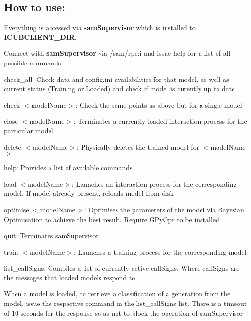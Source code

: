 \subsection*{How to use\+:}

Everything is accessed via {\bfseries sam\+Supervisor} which is installed to {\bfseries I\+C\+U\+B\+C\+L\+I\+E\+N\+T\+\_\+\+D\+IR}.

Connect with {\bfseries sam\+Supervisor} via {\ttfamily /sam/rpc\+:i} and issue {\ttfamily help} for a list of all possible commands
\begin{DoxyItemize}
\item {\ttfamily check\+\_\+all}\+: Check data and config.\+ini availabilities for that model, as well as current status (Training or Loaded) and check if model is curently up to date
\item {\ttfamily check $<$model\+Name$>$}\+: Check the same points as above but for a single model
\item {\ttfamily close $<$model\+Name$>$}\+: Terminates a currently loaded interaction process for the particular model
\item {\ttfamily delete $<$model\+Name$>$}\+: Physically deletes the trained model for {\ttfamily $<$model\+Name$>$}
\item {\ttfamily help}\+: Provides a list of available commands
\item {\ttfamily load $<$model\+Name$>$}\+: Launches an interaction process for the corresponding model. If model already present, reloads model from disk
\item {\ttfamily optimise $<$model\+Name$>$}\+: Optimises the parameters of the model via Bayesian Optimisation to achieve the best result. Require G\+Py\+Opt to be installed
\item {\ttfamily quit}\+: Terminates sam\+Supervisor
\item {\ttfamily train $<$model\+Name$>$}\+: Launches a training process for the corresponding model
\item {\ttfamily list\+\_\+call\+Signs}\+: Compiles a list of currently active call\+Signs. Where call\+Signs are the messages that loaded models respond to
\end{DoxyItemize}

When a model is loaded, to retrieve a classification of a generation from the model, issue the respective command in the list\+\_\+call\+Signs list. There is a timeout of 10 seconds for the response so as not to block the operation of sam\+Supervisor


